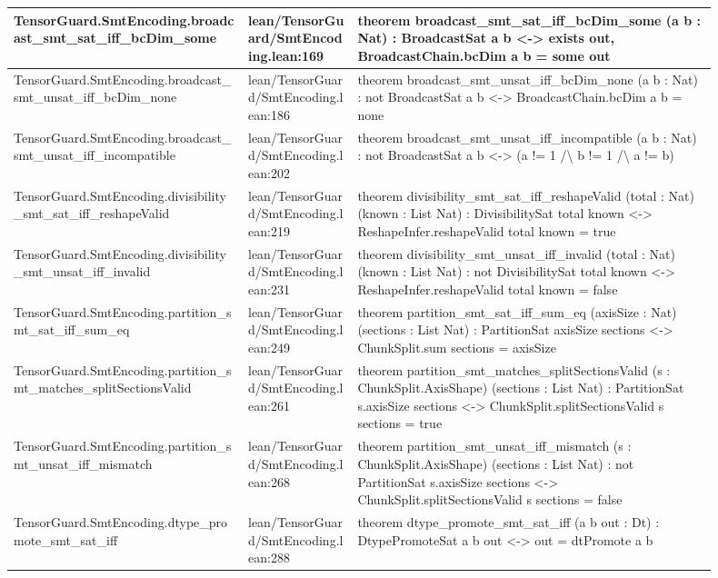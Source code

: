 \documentclass[10pt]{article}
\begin{document}
\begin{longtable}{|p{0.30\linewidth}|p{0.14\linewidth}|p{0.46\linewidth}|}
\hline
TensorGuard.SmtEncoding.broadcast\_smt\_sat\_iff\_bcDim\_some & lean/TensorGuard/SmtEncoding.lean:169 & theorem broadcast\_smt\_sat\_iff\_bcDim\_some (a b : Nat) : BroadcastSat a b <-> exists out, BroadcastChain.bcDim a b = some out \\
\hline
TensorGuard.SmtEncoding.broadcast\_smt\_unsat\_iff\_bcDim\_none & lean/TensorGuard/SmtEncoding.lean:186 & theorem broadcast\_smt\_unsat\_iff\_bcDim\_none (a b : Nat) : not  BroadcastSat a b <-> BroadcastChain.bcDim a b = none \\
\hline
TensorGuard.SmtEncoding.broadcast\_smt\_unsat\_iff\_incompatible & lean/TensorGuard/SmtEncoding.lean:202 & theorem broadcast\_smt\_unsat\_iff\_incompatible (a b : Nat) : not  BroadcastSat a b <-> (a != 1 /\textbackslash{} b != 1 /\textbackslash{} a != b) \\
\hline
TensorGuard.SmtEncoding.divisibility\_smt\_sat\_iff\_reshapeValid & lean/TensorGuard/SmtEncoding.lean:219 & theorem divisibility\_smt\_sat\_iff\_reshapeValid (total : Nat) (known : List Nat) : DivisibilitySat total known <-> ReshapeInfer.reshapeValid total known = true \\
\hline
TensorGuard.SmtEncoding.divisibility\_smt\_unsat\_iff\_invalid & lean/TensorGuard/SmtEncoding.lean:231 & theorem divisibility\_smt\_unsat\_iff\_invalid (total : Nat) (known : List Nat) : not  DivisibilitySat total known <-> ReshapeInfer.reshapeValid total known = false \\
\hline
TensorGuard.SmtEncoding.partition\_smt\_sat\_iff\_sum\_eq & lean/TensorGuard/SmtEncoding.lean:249 & theorem partition\_smt\_sat\_iff\_sum\_eq (axisSize : Nat) (sections : List Nat) : PartitionSat axisSize sections <-> ChunkSplit.sum sections = axisSize \\
\hline
TensorGuard.SmtEncoding.partition\_smt\_matches\_splitSectionsValid & lean/TensorGuard/SmtEncoding.lean:261 & theorem partition\_smt\_matches\_splitSectionsValid (s : ChunkSplit.AxisShape) (sections : List Nat) : PartitionSat s.axisSize sections <-> ChunkSplit.splitSectionsValid s sections = true \\
\hline
TensorGuard.SmtEncoding.partition\_smt\_unsat\_iff\_mismatch & lean/TensorGuard/SmtEncoding.lean:268 & theorem partition\_smt\_unsat\_iff\_mismatch (s : ChunkSplit.AxisShape) (sections : List Nat) : not  PartitionSat s.axisSize sections <-> ChunkSplit.splitSectionsValid s sections = false \\
\hline
TensorGuard.SmtEncoding.dtype\_promote\_smt\_sat\_iff & lean/TensorGuard/SmtEncoding.lean:288 & theorem dtype\_promote\_smt\_sat\_iff (a b out : Dt) : DtypePromoteSat a b out <-> out = dtPromote a b \\

\end{longtable}
\end{document}
